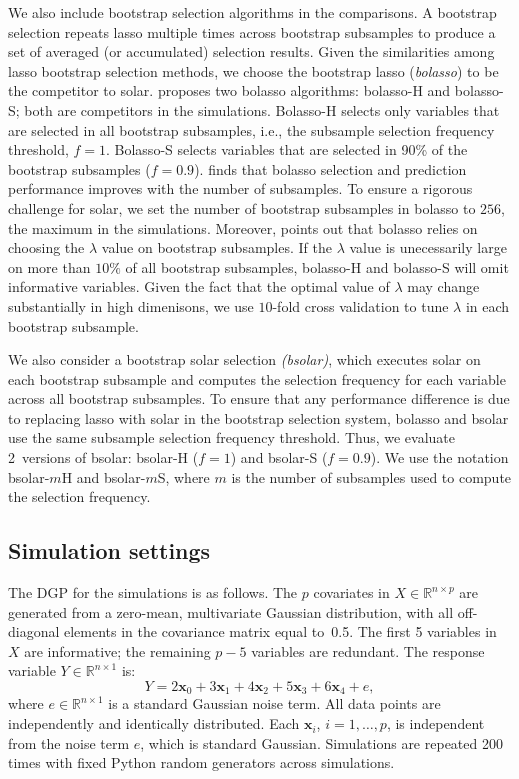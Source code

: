 \documentclass[11pt,review,authoryear]{elsarticle}
\begin{document}
We also include bootstrap selection algorithms in the comparisons. A bootstrap selection repeats lasso multiple times across bootstrap subsamples to produce a set of averaged (or accumulated) selection results. Given the similarities among lasso bootstrap selection methods, we choose the \citet{bach2008bolasso} bootstrap lasso (\emph{bolasso}) to be the competitor to solar. \citet{bach2008bolasso} proposes two bolasso algorithms: bolasso-H and bolasso-S; both are competitors in the simulations. Bolasso-H selects only variables that are selected in all bootstrap subsamples, i.e., the subsample selection frequency threshold, $f=1$. Bolasso-S selects variables that are selected in 90\% of the bootstrap subsamples ($f=0.9$). \citet{bach2008bolasso} finds that bolasso selection and prediction performance improves with the number of subsamples. To ensure a rigorous challenge for solar, we set the number of bootstrap subsamples in bolasso to $256$, the maximum in the \citet{bach2008bolasso} simulations. Moreover, \citet{meinshausen2010stability} points out that bolasso relies on choosing the $\lambda$ value on bootstrap subsamples. If the $\lambda$ value is unecessarily large on more than $10\%$ of all bootstrap subsamples, bolasso-H and bolasso-S will omit informative variables. Given the fact that the optimal value of $\lambda$ may change substantially in high dimenisons, we use $10$-fold cross validation to tune $\lambda$ in each bootstrap subsample.

We also consider a bootstrap solar selection \emph{(bsolar)}, which executes solar on each bootstrap subsample and computes the selection frequency for each variable across all bootstrap subsamples. To ensure that any performance difference is due to replacing lasso with solar in the bootstrap selection system, bolasso and bsolar use the same subsample selection frequency threshold. Thus, we evaluate 2~versions of bsolar: bsolar-H ($f=1$) and bsolar-S ($f=0.9$). We use the notation bsolar-$m$H and bsolar-$m$S, where $m$ is the number of subsamples used to compute the selection frequency.

\subsection{Simulation settings}

The DGP for the simulations is as follows. The $p$ covariates in $X \in \mathbb{R}^{n \times p}$ are generated from a zero-mean, multivariate Gaussian distribution, with all off-diagonal elements in the covariance matrix equal to~0.5. The first 5 variables in $X$ are informative; the remaining $p-5$ variables are redundant. The response variable $Y \in \mathbb{R}^{n \times 1}$ is:
%
\begin{equation}
%
  Y =  2 \mathbf{x}_0 + 3 \mathbf{x}_1 + 4 \mathbf{x}_2 + 5 \mathbf{x}_3 + 6 \mathbf{x}_4  + e,
  \label{eqn:pop_model}
\end{equation}
%
where $e\in \mathbb{R}^{n \times 1}$ is a standard Gaussian noise term. All data points are independently and identically distributed. Each $\mathbf{x}_i$, $i=1,\ldots,p$, is independent from the noise term $e$, which is standard Gaussian. Simulations are repeated 200 times with fixed Python random generators across simulations.
\end{document}
